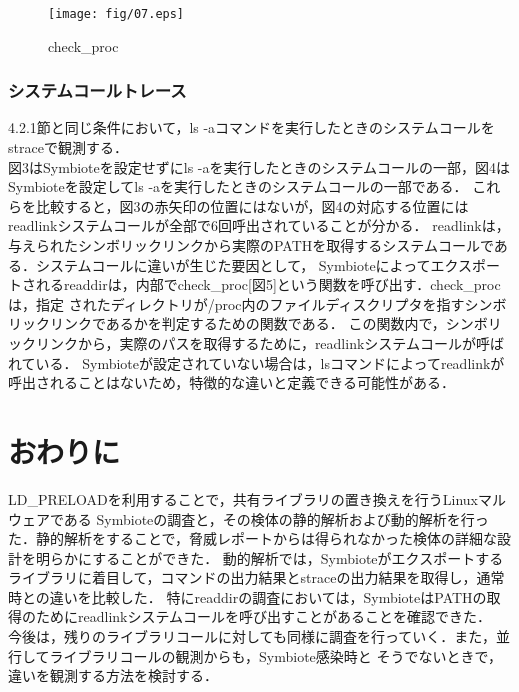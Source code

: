 \documentclass[submit,techreq,noauthor]{eco}	%
\begin{document}
\begin{figure}[t]
	\centering
  \texttt{[image: fig/07.eps]}
	\caption{check\_proc}
	\label{fig:readdir}
\end{figure}


\subsubsection{システムコールトレース}
4.2.1節と同じ条件において，ls -aコマンドを実行したときのシステムコールをstraceで観測する．\\
図3はSymbioteを設定せずにls -aを実行したときのシステムコールの一部，図4はSymbioteを設定してls -aを実行したときのシステムコールの一部である．
これらを比較すると，図3の赤矢印の位置にはないが，図4の対応する位置にはreadlinkシステムコールが全部で6回呼出されていることが分かる． 
readlinkは，与えられたシンボリックリンクから実際のPATHを取得するシステムコールである．システムコールに違いが生じた要因として，
Symbioteによってエクスポートされるreaddirは，内部でcheck\_proc[図5]という関数を呼び出す．check\_procは，指定
されたディレクトリが/proc内のファイルディスクリプタを指すシンボリックリンクであるかを判定するための関数である．
この関数内で，シンボリックリンクから，実際のパスを取得するために，readlinkシステムコールが呼ばれている．
Symbioteが設定されていない場合は，lsコマンドによってreadlinkが呼出されることはないため，特徴的な違いと定義できる可能性がある．\\




\section{おわりに}
LD\_PRELOADを利用することで，共有ライブラリの置き換えを行うLinuxマルウェアである
Symbioteの調査と，その検体の静的解析および動的解析を行った．静的解析をすることで，脅威レポートからは得られなかった検体の詳細な設計を明らかにすることができた．
動的解析では，Symbioteがエクスポートするライブラリに着目して，コマンドの出力結果とstraceの出力結果を取得し，通常時との違いを比較した．
特にreaddirの調査においては，SymbioteはPATHの取得のためにreadlinkシステムコールを呼び出すことがあることを確認できた．\\
今後は，残りのライブラリコールに対しても同様に調査を行っていく．また，並行してライブラリコールの観測からも，Symbiote感染時と
そうでないときで，違いを観測する方法を検討する．

\setlength\baselineskip{12pt}
{\small
	
	
}
\end{document}

